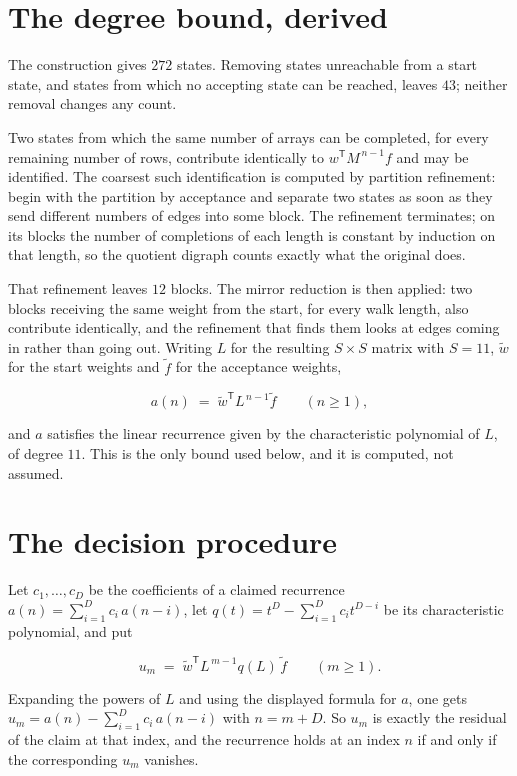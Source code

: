 \documentclass[11pt]{article}
\theoremstyle{definition}
\begin{document}
\section{The degree bound, derived}

The construction gives $272$ states. Removing states unreachable from a start state, and states from which no accepting state can be reached, leaves $43$; neither removal changes any count.

Two states from which the same number of arrays can be completed, for every remaining number of rows, contribute identically to $w^{\mathsf T}M^{\,n-1}f$ and may be identified. The coarsest such identification is computed by partition refinement: begin with the partition by acceptance and separate two states as soon as they send different numbers of edges into some block. The refinement terminates; on its blocks the number of completions of each length is constant by induction on that length, so the quotient digraph counts exactly what the original does.

That refinement leaves $12$ blocks. The mirror reduction is then applied: two blocks receiving the same weight from the start, for every walk length, also contribute identically, and the refinement that finds them looks at edges coming in rather than going out. Writing $L$ for the resulting $S \times S$ matrix with $S = 11$, $\tilde w$ for the start weights and $\tilde f$ for the acceptance weights,

\[a(n) \;=\; \tilde w^{\mathsf T} L^{\,n-1} \tilde f \qquad (n \ge 1),\]

and $a$ satisfies the linear recurrence given by the characteristic polynomial of $L$, of degree $11$. This is the only bound used below, and it is computed, not assumed.

\section{The decision procedure}

Let $c_1,\dots,c_D$ be the coefficients of a claimed recurrence $a(n) = \sum_{i=1}^{D} c_i\,a(n-i)$, let $q(t) = t^{D} - \sum_{i=1}^{D} c_i t^{D-i}$ be its characteristic polynomial, and put

\[u_m \;=\; \tilde w^{\mathsf T} L^{\,m-1} q(L)\,\tilde f \qquad (m \ge 1).\]

Expanding the powers of $L$ and using the displayed formula for $a$, one gets $u_m = a(n) - \sum_{i=1}^{D} c_i\,a(n-i)$ with $n = m + D$. So $u_m$ is exactly the residual of the claim at that index, and the recurrence holds at an index $n$ if and only if the corresponding $u_m$ vanishes.
\end{document}
